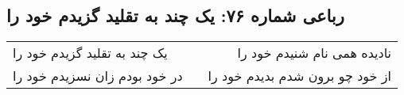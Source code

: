 \begin{center}
\section*{رباعی شماره ۷۶: یک چند به تقلید گزیدم خود را}
\label{sec:0076}
\begin{longtable}{l p{0.5cm} r}
یک چند به تقلید گزیدم خود را
&&
نادیده همی نام شنیدم خود را
\\
در خود بودم زان نسزیدم خود را
&&
از خود چو برون شدم بدیدم خود را
\\
\end{longtable}
\end{center}
